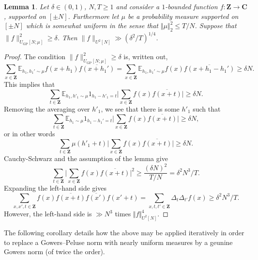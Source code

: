 \documentclass[11pt,reqno]{amsart}
\numberwithin{equation}{section}
\newtheorem{lemma}[theorem]{Lemma}
\theoremstyle{definition}
\theoremstyle{remark}
\newcommand{\snorm}[1]{\lVert#1\rVert}
\newcommand{\mb}{\mathbb}
\newcommand{\ol}{\overline}
\renewcommand{\le}{\leqslant}
\renewcommand{\ge}{\geqslant}
\newcommand\Z{\mathbf{Z}}
\newcommand\C{\mathbf{C}}
\newcommand\E{\mb{E}}
\newcommand\GP{\operatorname{GP}}
\begin{document}
\begin{lemma}\label{lem:replac-diff}
Let $\delta\in (0,1)$, $N, T\ge 1$ and consider a $1$-bounded function $f:\Z\to \C$, supported on $[\pm N]$. Furthermore let $\mu$ be a probability measure supported on $[\pm N]$ which is somewhat uniform in the sense that  $\Vert \mu \Vert_2^2 \le T/N$. Suppose that $\snorm{f}_{U_{\GP}[N;\mu]}^2\ge \delta$. Then $\snorm{f}_{U^2[N]}\gg (\delta^2/T)^{1/4}$.
\end{lemma}
\begin{proof}
The condition $\snorm{f}_{U_{\GP}[N;\mu]}^2\ge \delta$ is, written out,
\[\sum_{x\in \Z}\E_{h_1,h_1'\sim \mu}f(x+h_1)\ol{f(x+h_1')} = \sum_{x\in \Z}\E_{h_1,h_1'\sim \mu}f(x)\ol{f(x+h_1 - h_1')}\ge \delta N .\]
This implies that 
\[ \sum_{t\in \Z} \E_{h_1 , h'_1 \sim \mu} 1_{h_1 - h'_1 = t} \Big|\sum_{x\in \Z}f(x)\ol{f(x+t)}\Big|\ge \delta N.\]
Removing the averaging over $h'_1$, we see that there is some $h'_1$ such that 
\[\sum_{t\in \Z}\E_{h_1 \sim \mu}1_{h_1 - h_1' = t} \Big|\sum_{x\in \Z}f(x)\ol{f(x+t)}\Big|\ge \delta N, \] or in other words
\[ \sum_{t \in \Z} \mu(h'_1 + t) \Big|\sum_{x\in \Z}f(x)\ol{f(x+t)}\Big|\ge \delta N. \]
Cauchy-Schwarz and the assumption of the lemma give
\[\sum_{t\in \Z}\Big|\sum_{x\in \Z}f(x)\ol{f(x+t)}\Big|^2\ge \frac{(\delta N)^2}{T/N} = \delta^2 N^3/T.\]
Expanding the left-hand side gives
\[\sum_{x,x',t\in \Z}f(x)\ol{f(x+t)}\ol{f(x')}f(x'+t) = \sum_{x,t,t'\in \Z}\Delta_{t}\Delta_{t'}f(x)\ge \delta^2 N^3/T.\] However, the left-hand side is $\gg N^3$ times $\Vert f \Vert^4_{U^2[N]}$.
\end{proof}

The following corollary details how the above may be applied iteratively in order to replace a Gowers--Peluse norm with nearly uniform measures by a geunine Gowers norm (of twice the order).
\end{document}

